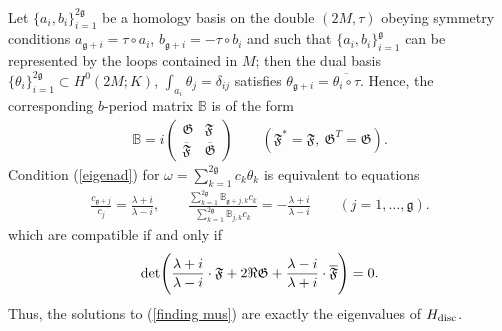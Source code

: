 \documentclass{amsart}
\begin{document}
\

Let $\{a_i,b_i\}_{i=1}^{\mathfrak{2g}}$ be a homology basis on the double $(2M,\tau)$ obeying symmetry conditions $a_{\mathfrak{g}+i}=\tau\circ a_{i}$, $b_{\mathfrak{g}+i}=-\tau\circ b_{i}$ and such that $\{a_i,b_i\}_{i=1}^{\mathfrak{g}}$ can be represented by the loops contained in $M$; then the dual basis $\{\theta_i\}_{i=1}^{2\mathfrak{g}}\subset H^0(2M;K)$, $\int_{a_i}\theta_j=\delta_{ij}$ satisfies $\theta_{\mathfrak{g}+i}=\overline{\theta_{i}\circ\tau}$. Hence, the corresponding $b$-period matrix $\mathbb{B}$ is of the form
\begin{align*}
\mathbb{B}=i\left(\begin{array}{cc}
\mathfrak{G} & \mathfrak{F}\\
\overline{\mathfrak{F}} & \overline{\mathfrak{G}}
\end{array}\right) \qquad (\mathfrak{F}^*=\mathfrak{F}, \ \mathfrak{G}^T=\mathfrak{G}).
\end{align*}
Condition (\ref{eigenad}) for $\omega=\sum_{k=1}^{2\mathfrak{g}}c_k\theta_k$ is equivalent to equations
\begin{align*}
\frac{c_{\mathfrak{g}+j}}{c_j}=\frac{\lambda+i}{\lambda-i}, \qquad \frac{\sum_{k=1}^{2\mathfrak{g}}\mathbb{B}_{\mathfrak{g}+j,k}c_k}{\sum_{k=1}^{2\mathfrak{g}}\mathbb{B}_{j,k}c_k}=-\frac{\lambda+i}{\lambda-i} \qquad (j=1,\dots,\mathfrak{g}).
\end{align*}
which are compatible if and only if
\begin{equation}
\label{finding mus}
{\rm det}\Bigg(\frac{\lambda+i}{\lambda-i}\cdot\mathfrak{F}+2\Re\mathfrak{G}+\frac{\lambda-i}{\lambda+i}\cdot\overline{\mathfrak{F}}\Bigg)=0.
\end{equation}
Thus, the solutions to (\ref{finding mus}) are exactly the eigenvalues of $H_{\rm disc}$.
\end{document}

